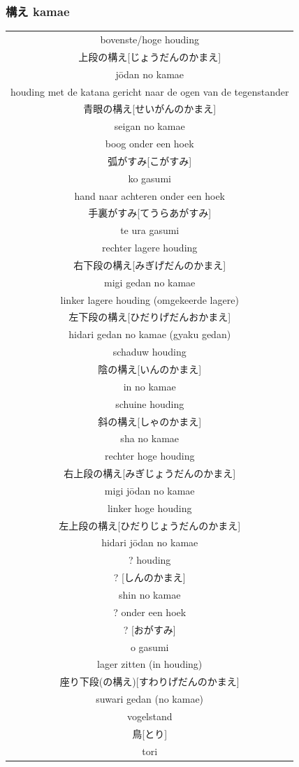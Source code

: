 \documentclass[12pt]{scrartcl}
\begin{document}
\begin{CJK*}{UTF8}{min}
\subsubsection{構え kamae}
\begin{table}[H]
\begin{center}
\begin{tabular}{c}
bovenste/hoge houding\\
上段の構え[じょうだんのかまえ]\\
j\={o}dan no kamae\\
\hline
houding met de katana gericht naar de ogen van de tegenstander\\
青眼の構え[せいがんのかまえ]\\
seigan no kamae\\
\hline
boog onder een hoek\\
弧がすみ[こがすみ]\\
ko gasumi\\
\hline
hand naar achteren onder een hoek\\
手裏がすみ[てうらあがすみ]\\
te ura gasumi\\
\hline
rechter lagere houding\\
右下段の構え[みぎげだんのかまえ]\\
migi gedan no kamae\\
\hline
linker lagere houding (omgekeerde lagere)\\
左下段の構え[ひだりげだんおかまえ]\\
hidari gedan no kamae (gyaku gedan)\\
\hline
schaduw houding\\
陰の構え[いんのかまえ]\\
in no kamae\\
\hline
schuine houding\\
斜の構え[しゃのかまえ]\\
sha no kamae\\
\hline
rechter hoge houding\\
右上段の構え[みぎじょうだんのかまえ]\\
migi j\={o}dan no kamae\\
\hline
linker hoge houding\\
左上段の構え[ひだりじょうだんのかまえ]\\
hidari j\={o}dan no kamae\\
\hline
? houding\\
? [しんのかまえ]\\
shin no kamae\\
\hline
? onder een hoek\\
? [おがすみ]\\
o gasumi\\
\hline
lager zitten (in houding)\\
座り下段(の構え)[すわりげだんのかまえ]\\
suwari gedan (no kamae)\\
\hline
vogelstand\\
鳥[とり]\\
tori
\end{tabular}
\end{center}
\label{kyuu_6_katori_kamae}
\end{table}


\end{CJK*}
\end{document}
